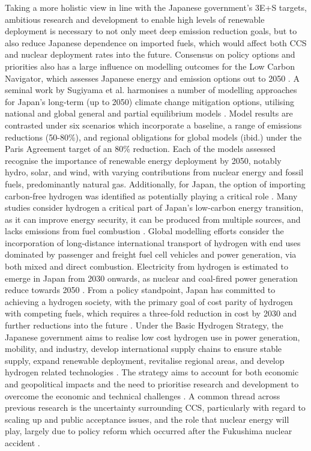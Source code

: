 Taking a more holistic view in line with the Japanese government's 3E+S targets, ambitious research and development to enable high levels of renewable deployment is necessary to not only meet deep emission reduction goals, but to also reduce Japanese dependence on imported fuels, which would affect both CCS and nuclear deployment rates into the future. Consensus on policy options and priorities also has a large influence on modelling outcomes for the Low Carbon Navigator, which assesses Japanese energy and emission options out to 2050 \cite{moinuddin_japan_2019}. A seminal work by Sugiyama et al. harmonises a number of modelling approaches for Japan's long-term (up to 2050) climate change mitigation options, utilising national and global general and partial equilibrium models \cite{sugiyama_japans_2019}. Model results are contrasted under six scenarios which incorporate a baseline, a range of emissions reductions (50-80\%), and regional obligations for global models (ibid.) under the Paris Agreement target of an 80\% reduction. Each of the models assessed recognise the importance of renewable energy deployment by 2050, notably hydro, solar, and wind, with varying contributions from nuclear energy and fossil fuels, predominantly natural gas. Additionally, for Japan, the option of importing carbon-free hydrogen was identified as potentially playing a critical role \cite{akimoto_estimates_2010, matsuo_global_2013, oshiro_diffusion_2015, sugiyama_japans_2019}. Many studies consider hydrogen a critical part of Japan's low-carbon energy transition, as it can improve energy security, it can be produced from multiple sources, and lacks emissions from fuel combustion \cite{iida_hydrogen_2019}. Global modelling efforts consider the incorporation of long-distance international transport of hydrogen with end uses dominated by passenger and freight fuel cell vehicles and power generation, via both mixed and direct combustion. Electricity from hydrogen is estimated to emerge in Japan from 2030 onwards, as nuclear and coal-fired power generation reduce towards 2050 \cite{ishimoto_significance_2017}. From a policy standpoint, Japan has committed to achieving a hydrogen society, with the primary goal of cost parity of hydrogen with competing fuels, which requires a three-fold reduction in cost by 2030 and further reductions into the future \cite{nagashima_japans_2018}. Under the Basic Hydrogen Strategy, the Japanese government aims to realise low cost hydrogen use in power generation, mobility, and industry, develop international supply chains to ensure stable supply, expand renewable deployment, revitalise regional areas, and develop hydrogen related technologies \cite{meti_basic_2017}. The strategy aims to account for both economic and geopolitical impacts and the need to prioritise research and development to overcome the economic and technical challenges \cite{nagashima_japans_2018}. A common thread across previous research is the uncertainty surrounding \gls{CCS}, particularly with regard to scaling up and public acceptance issues, and the role that nuclear energy will play, largely due to policy reform which occurred after the Fukushima nuclear accident \cite{oshiro_mid-century_2019}.

